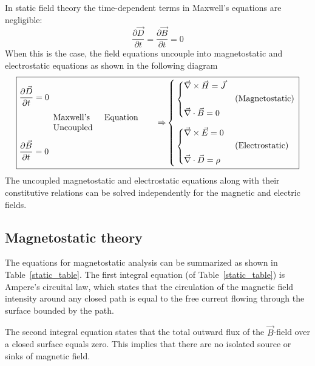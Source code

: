 \documentclass[11pt,a4paper,oneside]{book}
\numberwithin{equation}{section}
\theoremstyle{it}
\theoremstyle{definition}
\begin{document}
In static field theory the time-dependent terms in Maxwell's equations are negligible:
\begin{equation}\label{static_1}
	\frac{\partial \vec{D}}{\partial t} = \frac{\partial \vec{B}}{\partial t} = 0
\end{equation} 
When this is the case, the field equations uncouple into magnetostatic and electrostatic equations as shown in the following diagram
\begin{equation}\label{static_2}
\boxed{\begin{aligned}
	&\frac{\partial \vec{D}}{\partial t} = 0 \\[6pt]		
	& \qquad \qquad \parbox{10em}{Maxwell's Equation Uncoupled} \qquad \Rightarrow \\[6pt]
	&\frac{\partial \vec{B}}{\partial t} = 0
\end{aligned}
\left\lbrace 
	\begin{aligned}
		&\left\lbrace 
		\begin{aligned}
			&\vec{\nabla}\times\vec{H}=\vec{J}\\
			&\qquad\qquad\qquad\text{(Magnetostatic)} \\
			&\vec{\nabla}\cdot\vec{B}=0
		\end{aligned}
		\right.\\[6pt]
		&\left\lbrace 
		\begin{aligned}
			&\vec{\nabla}\times\vec{E}=0\\
			&\qquad\qquad\qquad\text{(Electrostatic)} \\
			&\vec{\nabla}\cdot\vec{D}=\rho
		\end{aligned}
		\right.
	\end{aligned}
\right. }
\end{equation} 
The uncoupled magnetostatic and electrostatic equations along with their constitutive relations can be solved independently for the magnetic and electric fields.

\subsection{Magnetostatic theory}
The equations for magnetostatic analysis can be summarized as shown in Table~\ref{static_table}. The first integral equation (of Table~\ref{static_table}) is Ampere's circuital law, which states that the circulation of the magnetic field intensity around any closed path is equal to the free current flowing through the surface bounded by the path.

The second integral equation states that the total outward flux of the $\vec{B}$-field over a closed surface equals zero. This implies that there are no isolated source or sinks of magnetic field.
\end{document}
